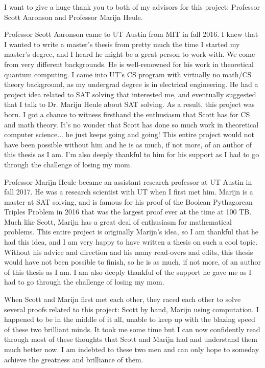 \documentclass[12pt]{report}	%
\begin{document}
\begin{acknowledgments}		%
%
I want to give a huge thank you to both of my advisors for this project: Professor Scott Aaronson and Professor Marijn Heule. \par
Professor Scott Aaronson came to UT Austin from MIT in fall 2016. I knew that I wanted to write a master's thesis from pretty much the time I started my master's degree, and I heard he might be a great person to work with. We come from very different backgrounds. He is well-renowned for his work in theoretical quantum computing. I came into UT's CS program with virtually no math/CS theory background, as my undergrad degree is in electrical engineering. He had a project idea related to SAT solving that interested me, and eventually suggested that I talk to Dr. Marijn Heule about SAT solving. As a result, this project was born. I got a chance to witness firsthand the enthusiasm that Scott has for CS and math theory. It's no wonder that Scott has done so much work in theoretical computer science... he just keeps going and going! This entire project would not have been possible without him and he is as much, if not more, of an author of this thesis as I am. I'm also deeply thankful to him for his support as I had to go through the challenge of losing my mom.\par
Professor Marijn Heule became an assistant research professor at UT Austin in fall 2017. He was a research scientist with UT when I first met him. Marijn is a master at SAT solving, and is famous for his proof of the Boolean Pythagorean Triples Problem in 2016 that was the largest proof ever at the time at 100 TB. Much like Scott, Marijn has a great deal of enthusiasm for mathematical problems. This entire project is originally Marijn's idea, so I am thankful that he had this idea, and I am very happy to have written a thesis on such a cool topic. Without his advice and direction and his many read-overs and edits, this thesis would have not been possible to finish, so he is as much, if not more, of an author of this thesis as I am. I am also deeply thankful of the support he gave me as I had to go through the challenge of losing my mom.\par
When Scott and Marijn first met each other, they raced each other to solve several proofs related to this project: Scott by hand, Marijn using computation. I happened to be in the middle of it all, unable to keep up with the blazing speed of these two brilliant minds. It took me some time but I can now confidently read through most of these thoughts that Scott and Marijn had and understand them much better now. I am indebted to these two men and can only hope to someday achieve the greatness and brilliance of them. \par

\end{acknowledgments}
\end{document}
